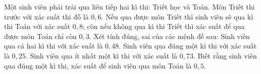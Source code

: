 \begin{ex}
Một sinh viên phải trải qua liên tiếp hai kì thi: Triết học và Toán. Môn Triết thi trước với xác suất thi đỗ là $0{,}6$. Nếu qua được môn Triết thì sinh viên sẽ qua kì thi Toán với xác suất $0{,}8$; còn nếu không qua kì thi Triết thì xác suất để qua được môn Toán chỉ còn $0{,}3$. Xét tính đúng, sai của các mệnh đề sau:
\choiceTF
{\True Sinh viên qua cả hai kì thi với xác suất là $0{,}48$.}
{Sinh viên qua đúng một kì thi với xác suất là $0{,}25$.}
{Sinh viên qua ít nhất một kì thi với xác suất là $0{,}73$.}
{\True Biết rằng sinh viên qua đúng một kì thi, xác suất để sinh viên qua môn Toán là $0{,}5$.}
\end{ex}
